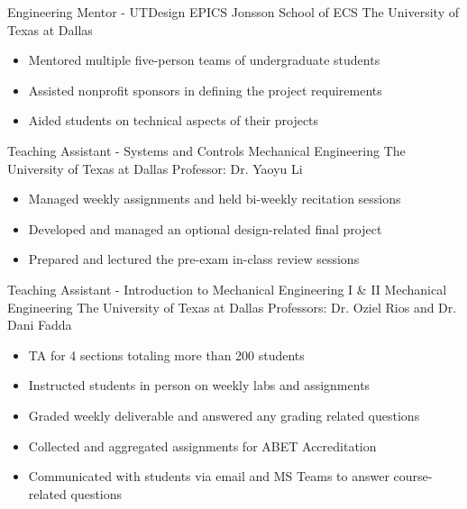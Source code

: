 \documentclass[11pt,letterpaper,roman]{moderncv} %
\begin{document}
{Engineering Mentor - UTDesign EPICS}
{Jonsson School of ECS}%
{The University of Texas at Dallas}{}
{\begin{itemize}
    \item Mentored multiple five-person teams of undergraduate students 
    \item Assisted nonprofit sponsors in defining the project requirements
    \item Aided students on technical aspects of their projects
\end{itemize}}

{Teaching Assistant - Systems and Controls}
{Mechanical Engineering}
{The University of Texas at Dallas}
{Professor: Dr. Yaoyu Li}
{\begin{itemize}
    \item Managed weekly assignments and held bi-weekly recitation sessions
    \item Developed and managed an optional design-related final project
    \item Prepared and lectured the pre-exam in-class review sessions
\end{itemize}}

{Teaching Assistant - Introduction to Mechanical Engineering I \& II}
{Mechanical Engineering}
{The University of Texas at Dallas}
{Professors: Dr. Oziel Rios and Dr. Dani Fadda}
{\begin{itemize}
    \item TA for 4 sections totaling more than 200 students
    \item Instructed students in person on weekly labs and assignments
    \item Graded weekly deliverable and answered any grading related questions
    \item Collected and aggregated assignments for ABET Accreditation
    \item Communicated with students via email and MS Teams to answer course-related questions
\end{itemize}}
\end{document}

